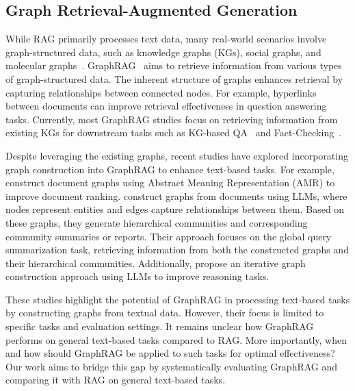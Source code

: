 \subsection{Graph Retrieval-Augmented Generation}
While RAG primarily processes text data, many real-world scenarios involve graph-structured data, such as knowledge graphs (KGs), social graphs, and molecular graphs~\cite{xia2021graph, ma2021deep}. GraphRAG~\cite{han2024retrieval, peng2024graph} aims to retrieve information from various types of graph-structured data. The inherent structure of graphs enhances retrieval by capturing relationships between connected nodes. For example, hyperlinks between documents can improve retrieval effectiveness in question answering tasks\cite{li2022dynamic}.  Currently, most GraphRAG studies focus on retrieving information from existing KGs for downstream tasks such as KG-based QA~\cite{tian2024graph, yasunaga2021qa} and Fact-Checking~\cite{kim2023factkg}. 

Despite leveraging the existing graphs, recent studies have explored incorporating graph construction into GraphRAG to enhance text-based tasks. For example, \citet{dong2024don} construct document graphs using Abstract Meaning Representation (AMR) to improve document ranking. \citet{edge2024local} construct graphs from documents using LLMs, where nodes represent entities and edges capture relationships between them. Based on these graphs, they generate hierarchical communities and corresponding community summaries or reports. Their approach focuses on the global query summarization task, retrieving information from both the constructed graphs and their hierarchical communities. Additionally, \citet{han2025reasoning} propose an iterative graph construction approach using LLMs to improve reasoning tasks.

These studies highlight the potential of GraphRAG in processing text-based tasks by constructing graphs from textual data.
However, their focus is limited to specific tasks and evaluation settings. It remains unclear how GraphRAG performs on general text-based tasks compared to RAG. More importantly, when and how should GraphRAG be applied to such tasks for optimal effectiveness? Our work aims to bridge this gap by systematically evaluating GraphRAG and comparing it with RAG on general text-based tasks.


